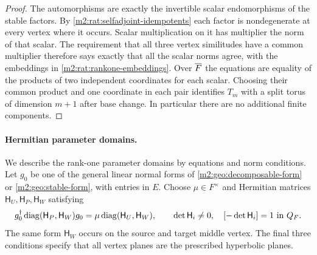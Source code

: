 \begin{proof}
The automorphisms are exactly the invertible scalar
endomorphisms of the stable factors.  By
\cref{m2:rat:selfadjoint-idempotents} each factor is
nondegenerate at every vertex where it occurs.  Scalar
multiplication on it has multiplier the norm of that
scalar.  The requirement that all three vertex
similitudes have a common multiplier therefore says
exactly that all the scalar norms agree, with the
embeddings in \eqref{m2:rat:rankone-embeddings}.
Over $\overline F$ the equations are equality of the products
of two independent coordinates for each scalar.  Choosing
their common product and one coordinate in each pair
identifies $T_m$ with a split torus of dimension $m+1$
after base change.  In particular there are no additional
finite components.
\end{proof}

\paragraph{Hermitian parameter domains.}

We describe the rank-one parameter domains by equations and
norm conditions.  Let $g_0$ be one of the
general linear normal forms of
\eqref{m2:geo:decomposable-form} or \eqref{m2:geo:stable-form},
with entries in $E$.  Choose $\mu\in F^\times$ and
Hermitian matrices $\mathsf H_U,\mathsf H_P,\mathsf H_W$ satisfying
\begin{equation}\label{m2:rat:rankone-Hermitian}
 g_0^\dagger\operatorname{diag}(\mathsf H_P,\mathsf H_W)g_0
       =\mu\operatorname{diag}(\mathsf H_U,\mathsf H_W),
 \qquad
 \det \mathsf H_i\ne0,\quad[-\det \mathsf H_i]=1\text{ in }Q_F.
\end{equation}
The same form $\mathsf H_W$ occurs on the source and target
middle vertex.  The final three conditions specify that
all vertex planes are the prescribed hyperbolic planes.

